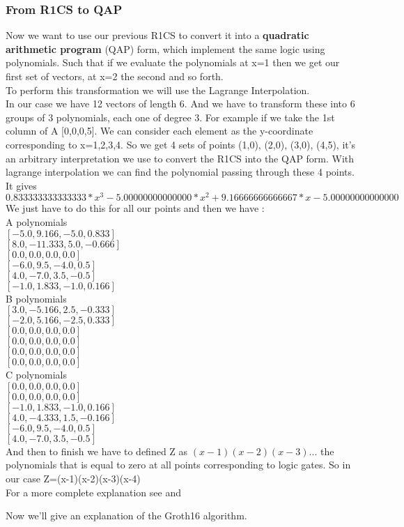\subsubsection{From R1CS to QAP}
Now we want to use our previous R1CS to convert it into a \textbf{quadratic arithmetic program} (QAP) form, which implement the same logic using polynomials. Such that if we evaluate the polynomials at x=1 then we get our first set of vectors, at x=2 the second and so forth.
\\To perform this transformation we will use the Lagrange Interpolation.
\\In our case we have 12 vectors of length 6. And we have to transform these into 6 groups of 3 polynomials, each one of degree 3. For example if we take the 1st column of A [0,0,0,5]. We can consider each element as the y-coordinate corresponding to x=1,2,3,4. So we get 4 sets of points (1,0), (2,0), (3,0), (4,5), it's an arbitrary interpretation we use to convert the R1CS into the QAP form. With lagrange interpolation we can find the polynomial passing through these 4 points.
\\It gives $0.833333333333333 * x^3 - 5.00000000000000 * x^2 + 9.16666666666667 * x - 5.00000000000000$
\\We just have to do this for all our points and then we have :
\\A polynomials
\\$[-5.0,9.166,-5.0,0.833]$
\\$[8.0,-11.333,5.0,-0.666]$
\\$[0.0,0.0,0.0,0.0]$
\\$[-6.0,9.5,-4.0,0.5]$
\\$[4.0,-7.0,3.5,-0.5]$
\\$[-1.0,1.833,-1.0,0.166]$
\\B polynomials
\\$[3.0,-5.166,2.5,-0.333]$
\\$[-2.0,5.166,-2.5,0.333]$
\\$[0.0,0.0,0.0,0.0]$
\\$[0.0,0.0,0.0,0.0]$
\\$[0.0,0.0,0.0,0.0]$
\\$[0.0,0.0,0.0,0.0]$
\\C polynomials
\\$[0.0,0.0,0.0,0.0]$
\\$[0.0,0.0,0.0,0.0]$
\\$[-1.0,1.833,-1.0,0.166]$
\\$[4.0,-4.333,1.5,-0.166]$
\\$[-6.0,9.5,-4.0,0.5]$
\\$[4.0,-7.0,3.5,-0.5]$
\\And then to finish we have to defined Z as $(x-1)(x-2)(x-3)...$ the polynomials that is equal to zero at all points corresponding to logic gates. So in our case Z=(x-1)(x-2)(x-3)(x-4)
\\For a more complete explanation see \cite{QAP_creation} and \cite{QAP_creation_2}

Now we'll give an explanation of the Groth16 algorithm.